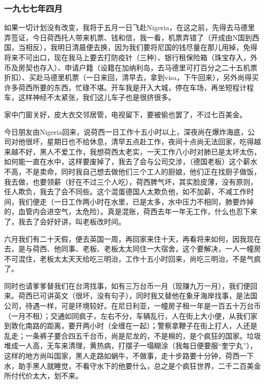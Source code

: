 \subsubsection{一九七七年四月}

\par {}
\par 如果一切计划没有改变，我将于五月一日飞赴Nigeria，在这之前，先得去马德里弄签证，今日荷西托人带来机票、钱和信，我一看，机票弄错了（开成由N国到西国，当相反），我明日清晨便去换，因为我们要将尼国的钱尽量在那儿用掉，免得将来不可出口，现在我马上要去打防疫针（三种）、银行租保险箱（珠宝存入，外币及房契也存入）、申请户籍（设籍在加纳利岛，去马德里可打百分之二十五机票折扣）、买赴马德里机票（一日来回，清早去，拿到visa，下午回来），另外尚得买许多荷西所要的东西，忙碌不堪。开车我是开入大城，停在车场，再坐短程计程车，这样神经不太紧张，我们这儿车子也是很挤很多。
\par 家中门窗关好，皮大衣交邻居管，电视留下，要被偷也罢了，不过七百美金。
\par 今日朋友由Nigeria回来，说荷西一日工作十五小时以上，深夜尚在爆炸海底，公司对他很坏，星期日也不给休息，清早五点赴工作，夜间十点尚无法回家，吃得越来越不好，黑人不爱工作，我想荷西太老实，一天工作八小时对肺已是太坏太伤，如何能一直在水中，这样要废掉了，我去了会与公司交涉，（德国老板）这个薪水不高，不是卖命，同时我自己想去做他们三个工人的厨娘，他们正在找厨子做饭，我去做，也要领薪（好在不过三个人吃），荷西脾气坏，其实脸皮薄，没有原则，任人欺负，我去了会不同些。这个混蛋德国人太欺负他，如不加薪，不减工作时间，我们便走（一日工作两小时在水里，已是太多，水中压力不相同，肺要炸掉的，血管内会进空气，太危险）。真是混账，荷西去年一年无工作，什么也忍下来了，我去了会好好讲，叫老板改时间。
\par 六月我们有二十天假，便去英国一周，再回家来住十天，再看将来如何，因我现在去，是与荷西、他同事、老板、老板太太同住一大宿舍，这个要解决，一人一幢房不可混住，老板太太天天给吃三明治，工作十五小时回来，尚吃三明治，不是气疯了。
\par 同时也请爹爹替我们在台湾找事，如有三万台币一月（现赚九万一月），我们便回来。荷西已可讲英文（很坏，没有句子），同时我又替他在象牙海岸找事，是法国公司，待遇一样，可是环境较好。在尼日利亚，一幢房子租一年是一百五十万台币（一月不租）；交通如同疯子，左右不分，车辆乱行，人在街上大小便，从我们家到敦化南路的距离，要开两小时（全缠在一起）；警察拿鞭子在街上打人，人还是乱走；一条裤子要合四五千台币，尚是尼龙的，不是棉的，是个疯狂的国家。垃圾堆成一人高，无车来清理，黄热病，打摆子一塌糊涂（我每日便要服“奎宁丸”），这样的地方尚叫国家，黑人走路如蜗牛，不做事，走十步路要十分钟，荷西一下水，助手黑人就睡觉，不看守水下的他要什么，总之是个疯狂世界，二千二百美金所付代价太大，划不来。
